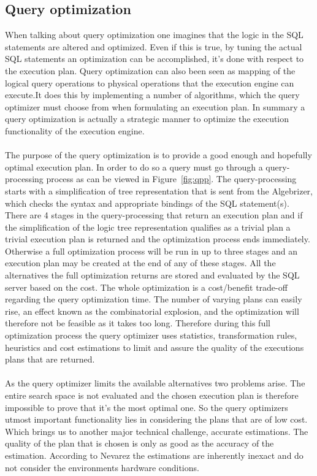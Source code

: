 \documentclass{cslthse-msc}
\begin{document}
\subsection{Query optimization}\label{sec:qopt}
When talking about query optimization one imagines that the logic in the SQL statements are altered and optimized. Even if this is true, by tuning the actual SQL statements an optimization can be accomplished, it's done with respect to the execution plan. Query optimization can also been seen as mapping of the logical query operations to physical operations that the execution engine can execute.It does this by implementing a number of algorithms, which the query optimizer must choose from when formulating an execution plan. In summary a query optimization is actually a strategic manner to optimize the execution functionality of the execution engine\cite{Nevarez}. \\\\ 
The purpose of the query optimization is to provide a good enough and hopefully optimal execution plan. In order to do so a query must go through a query-processing process as can be viewed in Figure~\ref{fig:qpp}. The query-processing starts with a simplification of tree representation that is sent from the Algebrizer, which checks the syntax and appropriate bindings of the SQL statement(s). There are 4 stages in the query-processing that return an execution plan and if the simplification of the logic tree representation qualifies as a trivial plan a trivial execution plan is returned and the optimization process ends immediately. Otherwise a full optimization process will be run in up to three stages and an execution plan may be created at the end of any of these stages. All the alternatives the full optimization returns are stored and evaluated by the SQL server based on the cost. The whole optimization is a cost/benefit trade-off regarding the query optimization time. The number of varying plans can easily rise, an effect known as the combinatorial explosion\cite{combo}, and the optimization will therefore not be feasible as it takes too long. Therefore during this full optimization process the query optimizer uses statistics, transformation rules, heuristics and cost estimations to limit and assure the quality of the executions plans that are returned.\\\\ 
As the query optimizer limits the available alternatives two problems arise. The entire search space is not evaluated and the chosen execution plan is therefore impossible to prove that it's the most optimal one. So the query optimizers utmost important functionality lies in considering the plans that are of low cost. Which brings us to another major technical challenge, accurate estimations. The quality of the plan that is chosen is only as good as the accuracy of the estimation. According to Nevarez\cite{Nevarez} the estimations are inherently inexact and do not consider the environments hardware conditions.
\end{document}
